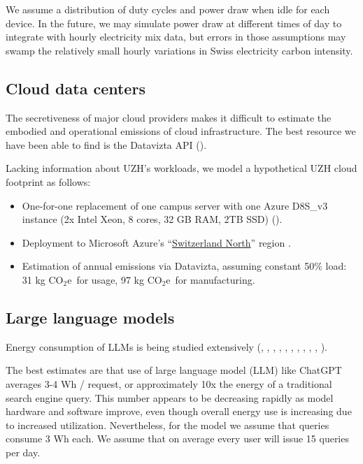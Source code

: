 \documentclass[11pt]{article}
\newcommand{\coe}{CO$_2$e}
\newcommand{\gcoe}{g \coe}
\newcommand{\kgcoe}{k\gcoe}
\begin{document}
We assume a distribution of duty cycles and power draw when idle for each device.
In the future, we may simulate power draw at different times of day to integrate with
hourly electricity mix data, but errors in those assumptions may swamp the relatively small
hourly variations in Swiss electricity carbon intensity.

\subsection{Cloud data centers}
\label{sec:cloud_data_centers}

The secretiveness of major cloud providers makes it difficult to estimate the embodied and operational emissions of cloud
infrastructure. The best resource we have been able to find is the Datavizta API (\cite{boavizta}).

Lacking information about UZH's workloads, we model a hypothetical UZH cloud footprint as follows:
\begin{itemize}
    \item One-for-one replacement of one campus server with one Azure D8S\_v3 instance (2x Intel
      Xeon, 8 cores, 32 GB RAM, 2TB SSD) (\cite{msftvms}).
    \item Deployment to Microsoft Azure's ``\href{https://datacenters.microsoft.com/globe/explore?info=region_switzerlandnorth}{Switzerland North}'' region .
    \item Estimation of annual emissions via Datavizta, assuming constant 50\% load: 31 \kgcoe\ for usage,
      97 \kgcoe\ for manufacturing.
\end{itemize}

\subsection{Large language models}

Energy consumption of LLMs is being studied extensively (\cite{budennyy2022eco2ai},
\cite{castano2023exploring},
\cite{devries2023growing},
\cite{gowda2024watt},
\cite{harding2024watts},
\cite{heguerte2023estimate},
\cite{luccioni2022estimating},
\cite{luccioni2023counting},
\cite{patterson2021carbon},
\cite{rodriguez2024evaluating},
\cite{tripp2024measuring}).

The best estimates are that use of large language model (LLM) like ChatGPT averages 3-4 Wh / request,
or approximately 10x the energy of a traditional search engine query. This number appears to be decreasing
rapidly as model hardware and software improve, even though overall energy use is increasing due to
increased utilization. Nevertheless, for the model we assume that queries consume 3 Wh each.
We assume that on average every user will issue 15 queries per day.
\end{document}
